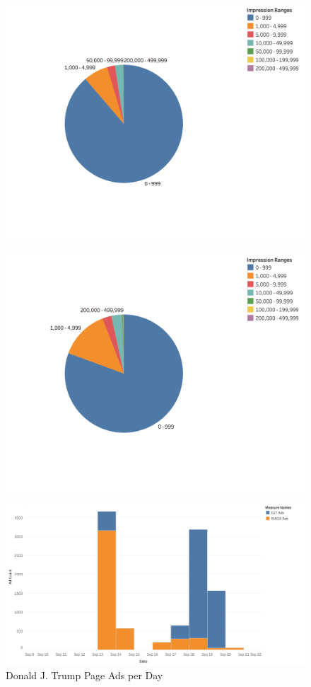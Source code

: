\documentclass[fleqn,10pt]{wlscirep}
\begin{document}
\begin{figure}
\centering
\begin{minipage}{.5\textwidth}
  \centering
  \includegraphics[width=.8\linewidth]{djt_campaign_impression_pie.png}
  \label{fig:djt_impression_dist}
\end{minipage}%
\begin{minipage}{.5\textwidth}
  \centering
  \includegraphics[width=.8\linewidth]{djt_maga_impression_pie.png}
  \label{fig:djt_maga_impression_dist}
\end{minipage}
\end{figure}

\begin{figure}
    \centering
    \includegraphics[width=.6\linewidth]{djt_ads_per_day.png}
    \caption{Donald J. Trump Page Ads per Day}
    \label{fig:djt_ads_per_day}
\end{figure}
\end{document}
